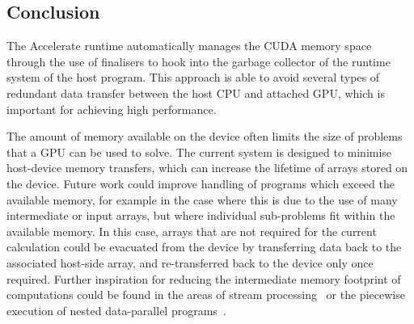 
\subsection{Conclusion}
\label{sec:memory_management_conclusion}

The Accelerate runtime automatically manages the CUDA memory space through the
use of finalisers to hook into the garbage collector of the runtime system of
the host program. This approach is able to avoid several types of redundant data
transfer between the host CPU and attached GPU, which is important for
achieving high performance.

The amount of memory available on the device often limits the size of problems
that a GPU can be used to solve. The current system is designed to minimise
host-device memory transfers, which can increase the lifetime of arrays stored
on the device. Future work could improve handling of programs which exceed the
available memory, for example in the case where this is due to the use of many
intermediate or input arrays, but where individual sub-problems fit within the
available memory. In this case, arrays that are not required for the current
calculation could be evacuated from the device by transferring data back to the
associated host-side array, and re-transferred back to the device only once
required. Further inspiration for reducing the intermediate memory footprint of
computations could be found in the areas of stream
processing~\cite{Thies:2002km} or the piecewise execution of nested
data-parallel programs~\cite{Keller:1999vy,Pfannenstiel:1999bk,Madsen:2013ew}.

